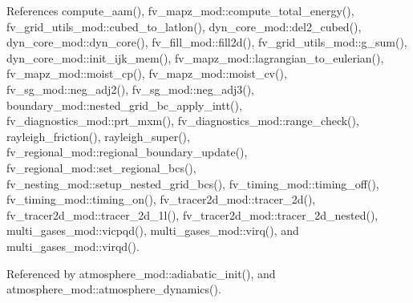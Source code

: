 References compute\-\_\-aam(), fv\-\_\-mapz\-\_\-mod\-::compute\-\_\-total\-\_\-energy(), fv\-\_\-grid\-\_\-utils\-\_\-mod\-::cubed\-\_\-to\-\_\-latlon(), dyn\-\_\-core\-\_\-mod\-::del2\-\_\-cubed(), dyn\-\_\-core\-\_\-mod\-::dyn\-\_\-core(), fv\-\_\-fill\-\_\-mod\-::fill2d(), fv\-\_\-grid\-\_\-utils\-\_\-mod\-::g\-\_\-sum(), dyn\-\_\-core\-\_\-mod\-::init\-\_\-ijk\-\_\-mem(), fv\-\_\-mapz\-\_\-mod\-::lagrangian\-\_\-to\-\_\-eulerian(), fv\-\_\-mapz\-\_\-mod\-::moist\-\_\-cp(), fv\-\_\-mapz\-\_\-mod\-::moist\-\_\-cv(), fv\-\_\-sg\-\_\-mod\-::neg\-\_\-adj2(), fv\-\_\-sg\-\_\-mod\-::neg\-\_\-adj3(), boundary\-\_\-mod\-::nested\-\_\-grid\-\_\-bc\-\_\-apply\-\_\-intt(), fv\-\_\-diagnostics\-\_\-mod\-::prt\-\_\-mxm(), fv\-\_\-diagnostics\-\_\-mod\-::range\-\_\-check(), rayleigh\-\_\-friction(), rayleigh\-\_\-super(), fv\-\_\-regional\-\_\-mod\-::regional\-\_\-boundary\-\_\-update(), fv\-\_\-regional\-\_\-mod\-::set\-\_\-regional\-\_\-bcs(), fv\-\_\-nesting\-\_\-mod\-::setup\-\_\-nested\-\_\-grid\-\_\-bcs(), fv\-\_\-timing\-\_\-mod\-::timing\-\_\-off(), fv\-\_\-timing\-\_\-mod\-::timing\-\_\-on(), fv\-\_\-tracer2d\-\_\-mod\-::tracer\-\_\-2d(), fv\-\_\-tracer2d\-\_\-mod\-::tracer\-\_\-2d\-\_\-1l(), fv\-\_\-tracer2d\-\_\-mod\-::tracer\-\_\-2d\-\_\-nested(), multi\-\_\-gases\-\_\-mod\-::vicpqd(), multi\-\_\-gases\-\_\-mod\-::virq(), and multi\-\_\-gases\-\_\-mod\-::virqd().



Referenced by atmosphere\-\_\-mod\-::adiabatic\-\_\-init(), and atmosphere\-\_\-mod\-::atmosphere\-\_\-dynamics().

